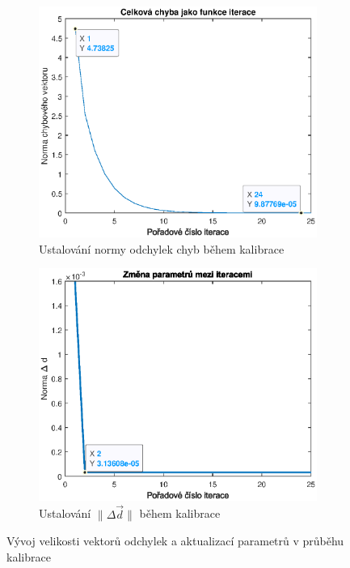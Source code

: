 \documentclass[twoside]{article}
\begin{document}
\begin{figure}[htbp]
	\centering
	\begin{subfigure}{0.45\linewidth}
		\includegraphics[width=\linewidth]{chyba.eps}
		\caption{Ustalování normy odchylek chyb během kalibrace}
		\label{fig:chyba}
	\end{subfigure}
	\begin{subfigure}{0.45\linewidth}
		\includegraphics[width=\linewidth]{delta_d.eps}
		\caption{Ustalování $\lVert \Delta \vec{d} \lVert$ během kalibrace}
		\label{fig:delta_d}
	\end{subfigure}
	\caption{Vývoj velikosti vektorů odchylek a aktualizací parametrů v průběhu kalibrace}
	\label{fig:presnost}
\end{figure}
\end{document}

